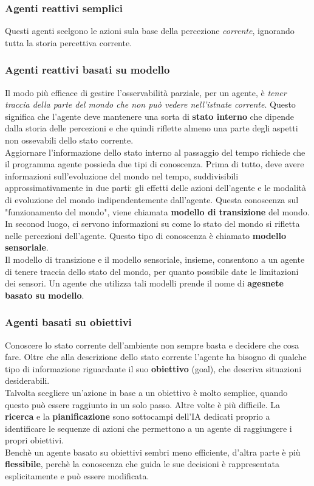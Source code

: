 \documentclass{article}
\begin{document}
\subsubsection{Agenti reattivi semplici}
Questi agenti scelgono le azioni sula base della percezione \textit{corrente}, ignorando tutta la storia percettiva corrente.
\subsubsection{Agenti reattivi basati su modello}
Il modo più efficace di gestire l'osservabilità parziale, per un agente, è \textit{tener traccia della parte del mondo che non può vedere nell'istnate corrente}. Questo significa che l'agente deve mantenere una sorta di \textbf{stato interno} che dipende dalla storia delle percezioni e che quindi riflette almeno una parte degli aspetti non ossevabili dello stato corrente. \\ Aggiornare l'informazione dello stato interno al passaggio del tempo richiede che il programma agente possieda due tipi di conoscenza. Prima di tutto, deve avere informazioni sull'evoluzione del mondo nel tempo, suddivisibili approssimativamente in due parti: gli effetti delle azioni dell'agente e le modalità di evoluzione del mondo indipendentemente dall'agente. Questa conoscenza sul "funzionamento del mondo", viene chiamata \textbf{modello di transizione} del mondo. \\
In seconod luogo, ci servono informazioni su come lo stato del mondo si rifletta nelle percezioni dell'agente. Questo tipo di conoscenza è chiamato \textbf{modello sensoriale}. 
\\ Il modello di transizione e il modello sensoriale, insieme, consentono a un agente di tenere traccia dello stato del mondo, per quanto possibile date le limitazioni dei sensori. Un agente che utilizza tali modelli prende il nome di \textbf{agesnete basato su modello}.
\subsubsection{Agenti basati su obiettivi}
Conoscere lo stato corrente dell'ambiente non sempre basta e decidere che cosa fare. Oltre che alla descrizione dello stato corrente l'agente ha bisogno di qualche tipo di informazione riguardante il suo \textbf{obiettivo} (goal), che descriva situazioni desiderabili. \\ Talvolta scegliere un'azione in base a un obiettivo è molto semplice, quando questo può essere raggiunto in un solo passo. Altre volte è più difficile. La \textbf{ricerca} e la \textbf{pianificazione} sono sottocampi dell'IA dedicati proprio a identificare le sequenze di azioni che permettono a un agente di raggiungere i propri obiettivi.
\\ Benchè un agente basato su obiettivi sembri meno efficiente, d'altra parte è più \textbf{flessibile}, perchè la conoscenza che guida le sue decisioni è rappresentata esplicitamente e può essere modificata.
\end{document}

